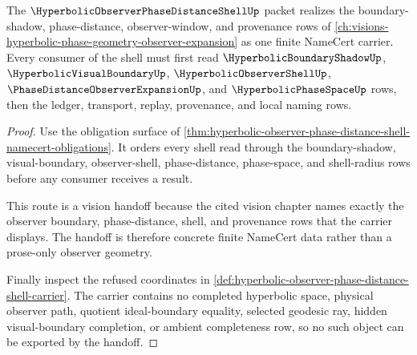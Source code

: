 \begin{theorem}
\label{thm:hyperbolic-observer-phase-distance-shell-vision-handoff}
The $\HyperbolicObserverPhaseDistanceShellUp$ packet realizes the boundary-shadow, phase-distance, observer-window, and provenance rows of \autoref{ch:visions-hyperbolic-phase-geometry-observer-expansion} as one finite NameCert carrier. Every consumer of the shell must first read $\HyperbolicBoundaryShadowUp$, $\HyperbolicVisualBoundaryUp$, $\HyperbolicObserverShellUp$, $\PhaseDistanceObserverExpansionUp$, and $\HyperbolicPhaseSpaceUp$ rows, then the ledger, transport, replay, provenance, and local naming rows.
\end{theorem}
\begin{proof}
Use the obligation surface of \autoref{thm:hyperbolic-observer-phase-distance-shell-namecert-obligations}. It orders every shell read through the boundary-shadow, visual-boundary, observer-shell, phase-distance, phase-space, and shell-radius rows before any consumer receives a result.

This route is a vision handoff because the cited vision chapter names exactly the observer boundary, phase-distance, shell, and provenance rows that the carrier displays. The handoff is therefore concrete finite NameCert data rather than a prose-only observer geometry.

Finally inspect the refused coordinates in \autoref{def:hyperbolic-observer-phase-distance-shell-carrier}. The carrier contains no completed hyperbolic space, physical observer path, quotient ideal-boundary equality, selected geodesic ray, hidden visual-boundary completion, or ambient completeness row, so no such object can be exported by the handoff.
\end{proof}



